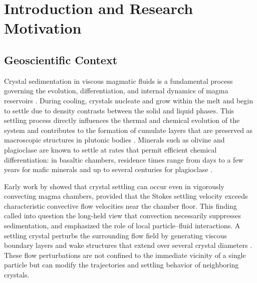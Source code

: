 \chapter{Introduction and Research Motivation}
\label{ch:introduction}

\section{Geoscientific Context}

Crystal sedimentation in viscous magmatic fluids is a fundamental process governing the evolution, differentiation, and internal dynamics of magma reservoirs \parencite{martin_crystal_1988,martin_fluid-dynamical_1989}. During cooling, crystals nucleate and grow within the melt and begin to settle due to density contrasts between the solid and liquid phases. This settling process directly influences the thermal and chemical evolution of the system and contributes to the formation of cumulate layers that are preserved as macroscopic structures in plutonic bodies \parencite{weinstein_evolution_1988,verhoeven_numerical_2009}. Minerals such as olivine and plagioclase are known to settle at rates that permit efficient chemical differentiation: in basaltic chambers, residence times range from days to a few years for mafic minerals and up to several centuries for plagioclase \parencite{martin_crystal_1988,martin_fluid-dynamical_1989}.

Early work by \textcite{martin_crystal_1988} showed that crystal settling can occur even in vigorously convecting magma chambers, provided that the Stokes settling velocity exceeds characteristic convective flow velocities near the chamber floor. This finding called into question the long-held view that convection necessarily suppresses sedimentation, and emphasized the role of local particle--fluid interactions. A settling crystal perturbs the surrounding flow field by generating viscous boundary layers and wake structures that extend over several crystal diameters \parencite{happel_low_1983}. These flow perturbations are not confined to the immediate vicinity of a single particle but can modify the trajectories and settling behavior of neighboring crystals.

